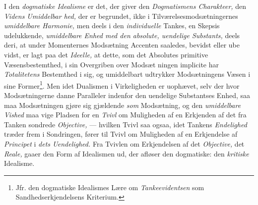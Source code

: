 \divrule

I den \emph{dogmatiske Idealisme} er det, der giver den
\emph{Dogmatismens Charakteer,} den \emph{Videns Umiddelbar\-%
hed,} der er begrundet, ikke i Tilværelsesmodsætningernes
\emph{umiddelbare Harmonie,} men deels i den \emph{individuelle}
Tankes, en Skepsis udelukkende, \emph{umiddelbare Enhed med
den absolute, uendelige Substants,} deels deri, at under
Momenternes Modsætning Accenten saaledes, bevidst eller ube\-%
vidst, er lagt paa det \emph{Ideelle,} at dette, som det Absolutes
primitive Væsensbestemthed, i sin Overgriben over Modsæt\-%
\setcounter{footnote}{0}%
ningen implicite har \emph{Totalitetens} Bestemthed i sig, og
umiddelbart udtrykker Modsætningens Væsen i sine Former\footnote{Jfr. den dogmatiske Idealismes Lære om \emph{Tankeevidentsen} som Sandhedserkjendelsens Kriterium.}.
Men idet Dualismen i Virkeligheden er uophævet, selv der
hvor Modsætningerne danne Paralleler indenfor den uendelige
Substantses Enhed, saa maa Modsætningen gjøre sig gjældende
\emph{som} Modsætning, og den \emph{umiddelbare Vished} maa vige
Pladsen for en \emph{Tvivl} om Muligheden af en Erkjenden af det
fra Tanken sondrede \emph{Objective,} --- hvilken Tvivl saa ogsaa,
idet Tankens \emph{Endelighed} træder frem i Sondringen, fører
til Tvivl om Muligheden af en Erkjendelse af \emph{Principet} i
\emph{dets Uendelighed.} Fra Tvivlen om Erkjendelsen af det
\emph{Objective,} det \emph{Reale,} gaaer den Form af Idealismen ud,
der afløser den dogmatiske: den \emph{kritiske} Idealisme.

